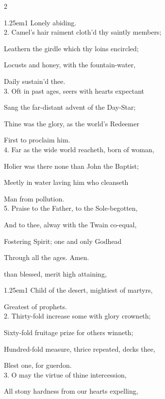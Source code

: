 \begin{paracol}{2}
\begin{hangparas}{1.25em}{1}
Lonely abiding.\\

2. Camel's hair raiment cloth'd thy saintly members;

Leathern the girdle which thy loins encircled;

Locusts and honey, with the fountain-water,

Daily sustain'd thee.\\

3. Oft in past ages, seers with hearts expectant

Sang the far-distant advent of the Day-Star;

Thine was the glory, as the world’s Redeemer

First to proclaim him.\\

4. Far as the wide world reacheth, born of woman,

Holier was there none than John the Baptist;

Meetly in water laving him who cleanseth

Man from pollution.\\

5. Praise to the Father, to the Sole-begotten,

And to thee, alway with the Twain co-equal,

Fostering Spirit; one and only Godhead

Through all the ages. Amen.
\end{hangparas}

\mattinsOfficeHymn
{} than blessed, merit high attaining,


\begin{hangparas}{1.25em}{1}
Child of the desert, mightiest of martyrs,

Greatest of prophets.\\

2. Thirty-fold increase some with glory crowneth;

Sixty-fold fruitage prize for others winneth;

Hundred-fold measure, thrice repeated, decks thee,

Blest one, for guerdon.\\

3. O may the virtue of thine intercession,

All stony hardness from our hearts expelling,


\end{hangparas}
\end{paracol}
